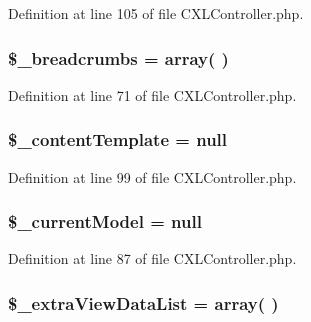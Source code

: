 Definition at line 105 of file CXLController.php.

\hypertarget{classCXLController_aa29f8061f06b0d1991b405eb2b5817fd}{
\subsubsection[{\$\_\-breadcrumbs}]{\setlength{\rightskip}{0pt plus 5cm}\$\_\-breadcrumbs = array( )}}
\label{classCXLController_aa29f8061f06b0d1991b405eb2b5817fd}


Definition at line 71 of file CXLController.php.

\hypertarget{classCXLController_a60dfb02e8707a7eabb0f0573a607ba6d}{
\subsubsection[{\$\_\-contentTemplate}]{\setlength{\rightskip}{0pt plus 5cm}\$\_\-contentTemplate = null}}
\label{classCXLController_a60dfb02e8707a7eabb0f0573a607ba6d}


Definition at line 99 of file CXLController.php.

\hypertarget{classCXLController_abdf2c7ca76e9731f3240034f06c59369}{
\subsubsection[{\$\_\-currentModel}]{\setlength{\rightskip}{0pt plus 5cm}\$\_\-currentModel = null}}
\label{classCXLController_abdf2c7ca76e9731f3240034f06c59369}


Definition at line 87 of file CXLController.php.

\hypertarget{classCXLController_a7d16c40c2d533779317b383d69e59ea0}{
\subsubsection[{\$\_\-extraViewDataList}]{\setlength{\rightskip}{0pt plus 5cm}\$\_\-extraViewDataList = array( )}}
\label{classCXLController_a7d16c40c2d533779317b383d69e59ea0}


